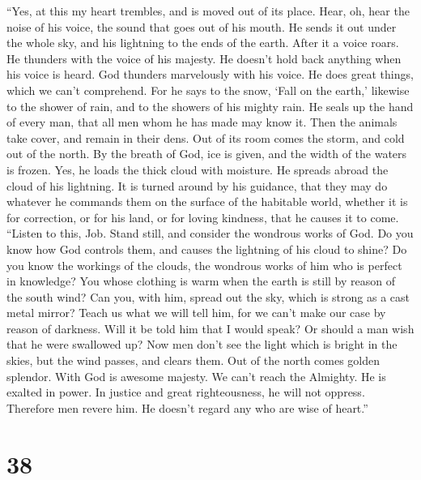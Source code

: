  ``Yes, at this my heart trembles, and is moved out of its
place.  Hear, oh, hear the noise of his voice, the sound
that goes out of his mouth.  He sends it out under the
whole sky, and his lightning to the ends of the earth. 
After it a voice roars. He thunders with the voice of his majesty. He
doesn't hold back anything when his voice is heard.  God
thunders marvelously with his voice. He does great things, which we
can't comprehend.  For he says to the snow, `Fall on the
earth,' likewise to the shower of rain, and to the showers of his mighty
rain.  He seals up the hand of every man, that all men
whom he has made may know it.  Then the animals take
cover, and remain in their dens.  Out of its room comes
the storm, and cold out of the north.  By the breath of
God, ice is given, and the width of the waters is frozen.
 Yes, he loads the thick cloud with moisture. He spreads
abroad the cloud of his lightning.  It is turned around
by his guidance, that they may do whatever he commands them on the
surface of the habitable world,  whether it is for
correction, or for his land, or for loving kindness, that he causes it
to come.  ``Listen to this, Job. Stand still, and
consider the wondrous works of God.  Do you know how God
controls them, and causes the lightning of his cloud to shine?
 Do you know the workings of the clouds, the wondrous
works of him who is perfect in knowledge?  You whose
clothing is warm when the earth is still by reason of the south wind?
 Can you, with him, spread out the sky, which is strong
as a cast metal mirror?  Teach us what we will tell him,
for we can't make our case by reason of darkness.  Will
it be told him that I would speak? Or should a man wish that he were
swallowed up?  Now men don't see the light which is
bright in the skies, but the wind passes, and clears them.
 Out of the north comes golden splendor. With God is
awesome majesty.  We can't reach the Almighty. He is
exalted in power. In justice and great righteousness, he will not
oppress.  Therefore men revere him. He doesn't regard any
who are wise of heart.''

\hypertarget{section-37}{%
\section{38}\label{section-37}}

